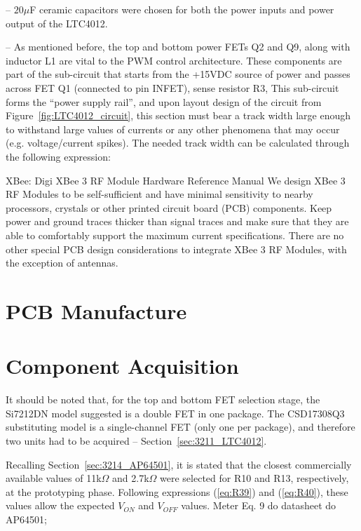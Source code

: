 -- $20 \mu$F ceramic capacitors were chosen for both the power inputs and power output of the LTC4012. 

-- As mentioned before, the top and bottom power FETs Q2 and Q9, along with inductor L1 are vital to the PWM control architecture. These components are part of the sub-circuit that starts from the +15VDC source of power and passes across FET Q1 (connected to pin INFET), sense resistor R3, 
This sub-circuit forms the ``power supply rail'', and upon layout design of the circuit from Figure~\ref{fig:LTC4012_circuit}, this section must bear a track width large enough to withstand large values of currents or any other phenomena that may occur (e.g. voltage/current spikes). The needed track width can be calculated through the following expression:

XBee: Digi XBee 3 RF Module Hardware Reference Manual
We design XBee 3 RF Modules to be self-sufficient and have minimal sensitivity to nearby processors,
crystals or other printed circuit board (PCB) components. Keep power and ground traces thicker than
signal traces and make sure that they are able to comfortably support the maximum current
specifications. There are no other special PCB design considerations to integrate XBee 3 RF Modules,
with the exception of antennas.

\section{PCB Manufacture}\label{sec:51_PCBmanufacture}

\section{Component Acquisition}\label{sec:52_ComponentAcquisition}



It should be noted that, for the top and bottom FET selection stage, the Si7212DN model suggested is a double FET in one package. The CSD17308Q3 substituting model is a single-channel FET (only one per package), and therefore two units had to be acquired -- Section~\ref{sec:3211_LTC4012}.

Recalling Section~\ref{sec:3214_AP64501}, it is stated that the closest commercially available values of 11k$\Omega$ and 2.7k$\Omega$ were selected for R10 and R13, respectively, at the prototyping phase. Following expressions (\ref{eq:R39}) and (\ref{eq:R40}), these values allow the expected $V_{ON}$ and $V_{OFF}$ values.
    Meter Eq. 9 do datasheet do AP64501;
    
